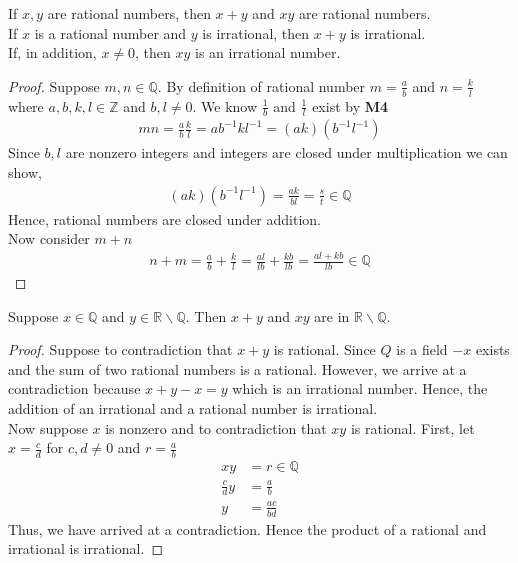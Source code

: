 \documentclass[12pt]{article}
\newcommand{\Z}{\mathbb{Z}}
\newcommand{\R}{\mathbb{R}}
\newenvironment{claim}[2][Claim]{\begin{trivlist}
		\item[\hskip \labelsep {\bfseries #1}\hskip \labelsep {\bfseries #2}]}{\end{trivlist}}
\begin{document}
	\begin{claim}{2.1.8a}
	If $x, y$ are rational numbers, then $x + y$ and $xy$ are rational numbers.\\
	If $x$ is a rational number and $y$ is irrational, then $x + y$ is irrational.\\
	If, in addition, $x \neq 0$, then $xy$ is an irrational number.
	\end{claim}
	\begin{proof}
		Suppose $m,n \in \mathbb{Q}$. By definition of rational number $m = \frac{a}{b}$ and $n = \frac{k}{l}$ where $a, b, k, l \in \Z$ and $b, l \neq 0$. We know $\frac{1}{b}$ and $\frac{1}{l}$ exist by \textbf{M4}
		\begin{align*}
			m n = \frac{a}{b} \frac{k}{l} = ab^{-1}kl^{-1} = (ak)(b^{-1}l^{-1})
		\end{align*}
	Since $b,l$ are nonzero integers and integers are closed under multiplication we can show,
	\begin{align*}
		(ak)(b^{-1}l^{-1}) = \frac{ak}{bl} = \frac{s}{t} \in \mathbb{Q}
	\end{align*}
	Hence, rational numbers are closed under addition.\\
	Now consider $m + n$
	\begin{align*}
		n + m = \frac{a}{b} + \frac{k}{l} = \frac{al}{lb} + \frac{kb}{lb} = \frac{al + kb}{lb} \in \mathbb{Q}
	\end{align*}
	\end{proof}
	\begin{claim}{2.1.8b}
		Suppose $x \in \mathbb{Q}$ and $y \in \R \backslash \mathbb{Q}$. Then $x + y$ and $xy$ are in $\R \backslash \mathbb{Q}$.
	\end{claim}
	\begin{proof}
	Suppose to contradiction that $x + y$ is rational. Since $Q$ is a field $-x$ exists and the sum of two rational numbers is a rational. However, we arrive at a contradiction because $x + y - x = y$ which is an irrational number. Hence, the addition of an irrational and a rational number is irrational.\\
	Now suppose $x$ is nonzero and to contradiction that $xy$ is rational. First, let $x = \frac{c}{d}$ for $c,d \neq 0$ and $r = \frac{a}{b}$
	\begin{align*}
		xy &= r \in \mathbb{Q}\\
		\frac{c}{d}y &= \frac{a}{b}\\
		y &= \frac{ac}{bd}
	\end{align*} 
	Thus, we have arrived at a contradiction. Hence the product of a rational and irrational is irrational.
	\end{proof}
\end{document}
